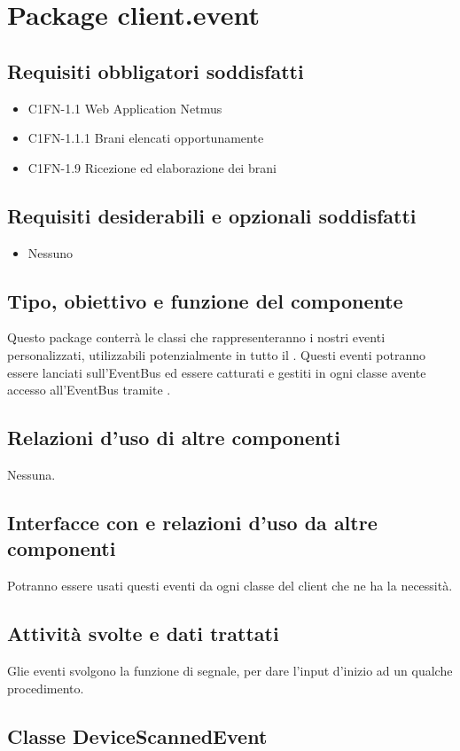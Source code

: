 \newpage
\section{Package client.event}
\subsection*{Requisiti obbligatori soddisfatti}
\begin{itemize}
    \item C1FN-1.1 Web Application Netmus
    \item C1FN-1.1.1 Brani elencati opportunamente
    \item C1FN-1.9 Ricezione ed elaborazione dei brani
\end{itemize}
\subsection*{Requisiti desiderabili e opzionali soddisfatti}
\begin{itemize}
    \item Nessuno
\end{itemize}
\subsection*{Tipo, obiettivo e funzione del componente}
Questo package conterr\`a le classi che rappresenteranno i nostri eventi
personalizzati, utilizzabili potenzialmente in tutto il .
Questi eventi potranno essere lanciati sull'EventBus ed essere catturati e
gestiti in ogni classe avente accesso all'EventBus tramite .
\subsection*{Relazioni d'uso di altre componenti}
Nessuna.
\subsection*{Interfacce con e relazioni d'uso da altre componenti}
Potranno essere usati questi eventi da ogni classe del client che ne ha la
necessit\`a.
\subsection*{Attivit\`a svolte e dati trattati}
Glie eventi svolgono la funzione di segnale, per dare l'input d'inizio ad un
qualche procedimento.

\subsection{Classe DeviceScannedEvent}
